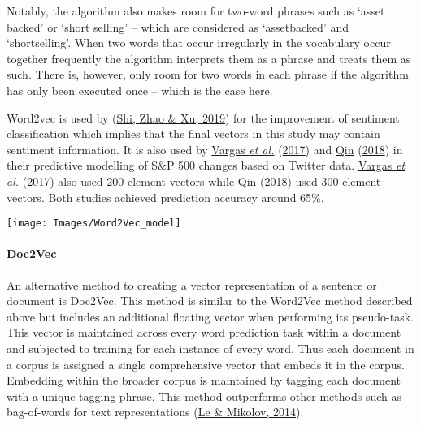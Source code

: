 \documentclass[11pt,preprint, authoryear]{elsarticle}
\let\origfigure\figure
\let\endorigfigure\endfigure
\renewenvironment{figure}[1][2] {
    \expandafter\origfigure\expandafter[H]
} {
    \endorigfigure
}
\numberwithin{equation}{section}
\numberwithin{figure}{section}
\numberwithin{table}{section}
\begin{document}
Notably, the algorithm also makes room for two-word phrases such as
`asset backed' or `short selling' -- which are considered as
`assetbacked' and `shortselling'. When two words that occur irregularly
in the vocabulary occur together frequently the algorithm interprets
them as a phrase and treats them as such. There is, however, only room
for two words in each phrase if the algorithm has only been executed
once -- which is the case here.

Word2vec is used by (\protect\hyperlink{ref-shi2019word2vec}{Shi, Zhao
\& Xu, 2019}) for the improvement of sentiment classification which
implies that the final vectors in this study may contain sentiment
information. It is also used by
\protect\hyperlink{ref-vargas2017deep}{Vargas \emph{et al.}}
(\protect\hyperlink{ref-vargas2017deep}{2017}) and
\protect\hyperlink{ref-qin230natural}{Qin}
(\protect\hyperlink{ref-qin230natural}{2018}) in their predictive
modelling of S\&P 500 changes based on Twitter data.
\protect\hyperlink{ref-vargas2017deep}{Vargas \emph{et al.}}
(\protect\hyperlink{ref-vargas2017deep}{2017}) also used 200 element
vectors while \protect\hyperlink{ref-qin230natural}{Qin}
(\protect\hyperlink{ref-qin230natural}{2018}) used 300 element vectors.
Both studies achieved prediction accuracy around 65\%.

\begin{figure}[H]

{\centering \texttt{[image: Images/Word2Vec\_model]} 

}

\caption{Word2Vec Model \label{Figure1}}\label{fig:Word2Vec Model}
\end{figure}

\hypertarget{doc2vec}{%
\paragraph{\texorpdfstring{Doc2Vec
\label{Doc2Vec}}{Doc2Vec }}\label{doc2vec}}

An alternative method to creating a vector representation of a sentence
or document is Doc2Vec. This method is similar to the Word2Vec method
described above but includes an additional floating vector when
performing its pseudo-task. This vector is maintained across every word
prediction task within a document and subjected to training for each
instance of every word. Thus each document in a corpus is assigned a
single comprehensive vector that embeds it in the corpus. Embedding
within the broader corpus is maintained by tagging each document with a
unique tagging phrase. This method outperforms other methods such as
bag-of-words for text representations
(\protect\hyperlink{ref-le2014distributed}{Le \& Mikolov, 2014}).
\end{document}

